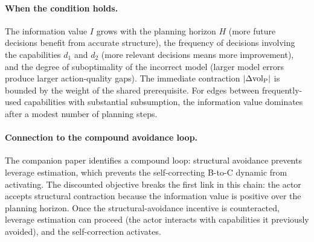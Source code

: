 \paragraph{When the condition holds.} The information value $I$ grows with
the planning horizon $H$ (more future decisions benefit from accurate
structure), the frequency of decisions involving the capabilities $d_1$ and
$d_2$ (more relevant decisions means more improvement), and the degree of
suboptimality of the incorrect model (larger model errors produce larger
action-quality gaps). The immediate contraction $|\Delta {\operatorname{vol}_{\mathrm{P}}}|$ is bounded by
the weight of the shared prerequisite. For edges between frequently-used
capabilities with substantial subsumption, the information value
dominates after a modest number of planning steps.

\paragraph{Connection to the compound avoidance loop.} The companion paper
identifies a compound loop: structural avoidance prevents leverage estimation,
which prevents the self-correcting B-to-C dynamic from activating. The
discounted objective breaks the first link in this chain: the actor accepts
structural contraction because the information value is positive over the
planning horizon. Once the structural-avoidance incentive is counteracted,
leverage estimation can proceed (the actor interacts with capabilities it
previously avoided), and the self-correction activates.

